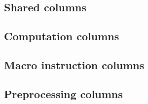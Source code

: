 \subsection{Shared columns}                \label{exp: columns: Shared}           
\subsection{Computation columns}           \label{exp: columns: Computation}      
\subsection{Macro instruction columns}     \label{exp: columns: Macro}            
\subsection{Preprocessing columns}         \label{exp: columns: Preprocessing}    
